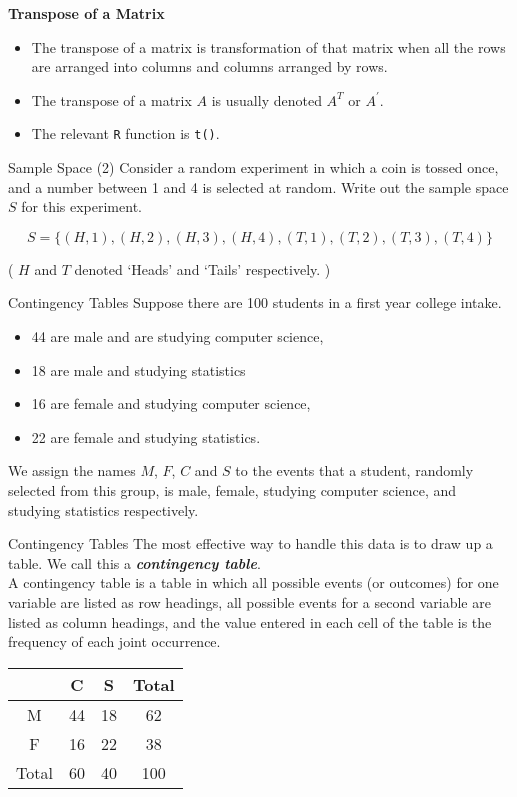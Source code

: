 {{{{{{{	
	\textbf{Transpose of a Matrix}
	\begin{itemize}
		
		\item The transpose of a matrix is transformation of that matrix when all the rows are arranged into columns and columns arranged by rows.
		\item The transpose of a matrix $A$ is usually denoted $A^{T}$ or $A^{\prime}$.
		\item The relevant \texttt{R} function is \texttt{t()}.
	\end{itemize}

	{Sample Space (2)}
	Consider a random experiment in which a coin is tossed once, and a number between 1 and 4 is selected at random.
	Write out the sample space $S$ for this experiment.
	
	\bigskip
	
	\[ S = \{(H,1),(H,2),(H,3),(H,4),(T,1),(T,2),(T,3),(T,4)\} \]
	
	( $H$ and $T$ denoted `Heads' and `Tails' respectively. )
	
}
{
	{Contingency Tables}
	Suppose there are 100 students in a first year college intake.  \begin{itemize} \item 44 are male and are studying computer science, \item 18 are male and studying statistics \item 16 are female and studying computer science, \item 22 are female and studying statistics. \end{itemize}
	\bigskip
	We assign the names $M$, $F$, $C$ and $S$ to the events that a student, randomly selected from this group, is male, female, studying computer science, and studying statistics respectively.
}
{
	{Contingency Tables}
	The most effective way to handle this data is to draw up a table. We call this a \textbf{\emph{contingency table}}.
	\\A contingency table is a table in which all possible events (or outcomes) for one variable are listed as
	row headings, all possible events for a second variable are listed as column headings, and the value entered in
	each cell of the table is the frequency of each joint occurrence.
	
	
	\begin{center}
		\begin{tabular}{|c|c|c|c|}
			\hline
			& C & S & Total \\ \hline
			M & 44 & 18 & 62 \\ \hline
			F & 16 & 22 & 38 \\ \hline
			Total & 60 & 40 & 100 \\ \hline
		\end{tabular}
	\end{center}
	
}}}}}}}
